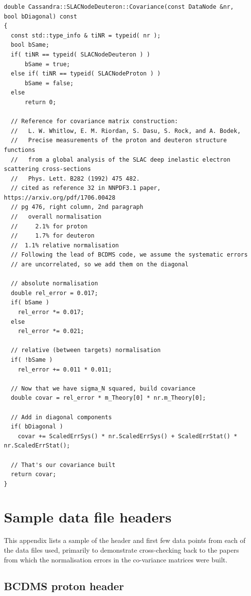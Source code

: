 \documentclass[12pt,a4paper]{report}
\begin{document}
\begin{Verbatim}[fontsize=\small]
double Cassandra::SLACNodeDeuteron::Covariance(const DataNode &nr, bool bDiagonal) const
{
  const std::type_info & tiNR = typeid( nr );
  bool bSame;
  if( tiNR == typeid( SLACNodeDeuteron ) )
      bSame = true;
  else if( tiNR == typeid( SLACNodeProton ) )
      bSame = false;
  else
      return 0;

  // Reference for covariance matrix construction:
  //   L. W. Whitlow, E. M. Riordan, S. Dasu, S. Rock, and A. Bodek,
  //   Precise measurements of the proton and deuteron structure functions
  //   from a global analysis of the SLAC deep inelastic electron scattering cross-sections
  //   Phys. Lett. B282 (1992) 475 482.
  // cited as reference 32 in NNPDF3.1 paper, https://arxiv.org/pdf/1706.00428
  // pg 476, right column, 2nd paragraph
  //   overall normalisation
  //     2.1% for proton
  //     1.7% for deuteron
  //  1.1% relative normalisation
  // Following the lead of BCDMS code, we assume the systematic errors
  // are uncorrelated, so we add them on the diagonal

  // absolute normalisation
  double rel_error = 0.017;
  if( bSame )
    rel_error *= 0.017;
  else
    rel_error *= 0.021;

  // relative (between targets) normalisation
  if( !bSame )
    rel_error += 0.011 * 0.011;

  // Now that we have sigma_N squared, build covariance
  double covar = rel_error * m_Theory[0] * nr.m_Theory[0];

  // Add in diagonal components
  if( bDiagonal )
    covar += ScaledErrSys() * nr.ScaledErrSys() + ScaledErrStat() * nr.ScaledErrStat();

  // That's our covariance built
  return covar;
}
\end{Verbatim}

\section{Sample data file headers} \label{data:header}

This appendix lists a sample of the header and first few data points from each of the data files used, primarily to demonstrate cross-checking back to the papers from which the normalisation errors in the co-variance matrices were built.

\subsection{BCDMS proton \cite{BCDMS:Proton} header}
\end{document}
